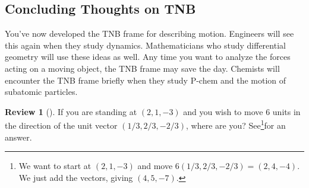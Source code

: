 \documentclass[10pt,]{book}
\theoremstyle{plain}
\theoremstyle{definition}
\theoremstyle{definition}
\theoremstyle{definition}
\newtheorem{project}{Review}[section]
\theoremstyle{definition}
\theoremstyle{definition}
\numberwithin{equation}{section}
\begin{document}
\subsection[{Concluding Thoughts on TNB}]{Concluding Thoughts on TNB}\label{subsection-46}
You've now developed the TNB frame for describing motion. Engineers will see this again when they study dynamics. Mathematicians who study differential geometry will use these ideas as well. Any time you want to analyze the forces acting on a moving object, the TNB frame may save the day. Chemists will encounter the TNB frame briefly when they study P-chem and the motion of subatomic particles.%
\begin{project}[]\label{project-15}
If you are standing at \((2,1,-3)\) and you wish to move 6 units in the direction of the unit vector \((1/3, 2/3, -2/3)\), where are you? See\footnote{We want to start at \((2,1,-3)\) and move \(6(1/3, 2/3, -2/3) = (2,4,-4)\). We just add the vectors, giving \((4,5,-7)\).\label{fn-8}}for an answer.%
\end{project}
\end{document}
